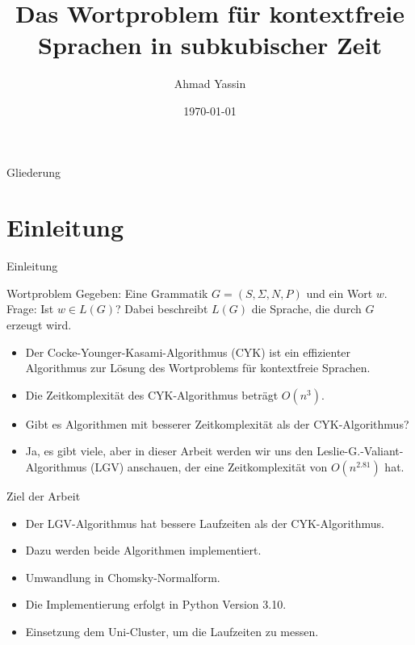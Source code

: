 \documentclass{beamer}
\title[Bachelorarbeit] %
{Das Wortproblem für kontextfreie Sprachen in subkubischer Zeit}
\author[] %
{Ahmad Yassin}
\institute[] %
{
	Bachelorarbeit\\
}
\date\today
\begin{document}
	
	\frame{\titlepage}
	\begin{frame}{Gliederung}
		\tableofcontents
	\end{frame}
	
	
	
	
	\section{Einleitung}
	

	\begin{frame}{Einleitung}
		\begin{block}{Wortproblem}
			Gegeben: Eine Grammatik $G = (S, \Sigma, N, P)$ und ein Wort $w$. \\
			Frage: Ist $w \in L(G)$? Dabei beschreibt $L(G)$ die Sprache, die durch $G$ erzeugt wird.
		\end{block}
		\pause
		\begin{itemize}
			\item Der Cocke-Younger-Kasami-Algorithmus (CYK) ist ein effizienter Algorithmus zur Lösung des Wortproblems für kontextfreie Sprachen.
			\item Die Zeitkomplexität des CYK-Algorithmus beträgt $O(n^{3})$.
			\item Gibt es Algorithmen mit besserer Zeitkomplexität als der CYK-Algorithmus?
			\pause
			\item Ja, es gibt viele, aber in dieser Arbeit werden wir uns den Leslie-G.-Valiant-Algorithmus (LGV) anschauen, der eine Zeitkomplexität von $O(n^{2.81})$ hat.
		\end{itemize}
	\end{frame}

	\begin{frame}{Ziel der Arbeit}
		\begin{itemize}
			\item Der LGV-Algorithmus hat bessere Laufzeiten als der CYK-Algorithmus.
			\pause
			\item Dazu werden beide Algorithmen implementiert.
			\pause
			\item Umwandlung in Chomsky-Normalform.
			\pause
			\item Die Implementierung erfolgt in Python Version 3.10.
			\pause
			\item Einsetzung dem Uni-Cluster, um die Laufzeiten zu messen.
		\end{itemize}
	\end{frame}
	
\end{document}
